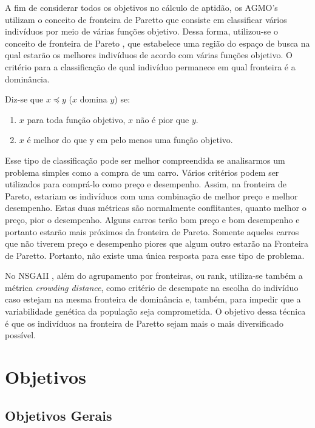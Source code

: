 \documentclass[]{article}
\begin{document}
	A fim de considerar todos os objetivos no cálculo de aptidão, os AGMO's utilizam o conceito de fronteira de Paretto \cite{Pareto} que consiste em classificar vários indivíduos por meio de várias funções objetivo. Dessa forma, utilizou-se o conceito de fronteira de Pareto  \cite{Pareto}, que estabelece uma região do espaço de busca na qual estarão os melhores indivíduos de acordo com várias funções objetivo. O critério para a classificação de qual indivíduo permanece em qual fronteira é a dominância.
	
	Diz-se que $x \preceq y$ ($x$ domina $y$) se:
	
	\begin{enumerate}
		\item $x$ para toda função objetivo, $x$ não é pior que $y$.
		
		\item $x$ é melhor do que y em pelo menos uma função objetivo.
	\end{enumerate}
	
	Esse tipo de classificação pode ser melhor compreendida se analisarmos um problema simples como a compra de um carro. Vários critérios podem ser utilizados para comprá-lo como preço e desempenho. Assim, na fronteira de Pareto, estariam os indivíduos com uma combinação de melhor preço e melhor desempenho. Estas duas métricas são normalmente conflitantes, quanto melhor o preço, pior o desempenho. Alguns carros terão bom preço e bom desempenho e portanto estarão mais próximos da fronteira de Pareto. Somente aqueles carros que não tiverem preço e desempenho piores que algum outro estarão na Fronteira de Paretto. Portanto, não existe uma única resposta para esse tipo de problema.
	
	No  NSGAII \cite{NSGAII}, além do agrupamento por fronteiras, ou rank, utiliza-se também a métrica \textit{crowding distance}, como critério de desempate na escolha do indivíduo caso estejam na mesma fronteira de dominância e, também, para impedir que a variabilidade genética da população seja comprometida. O objetivo dessa técnica é que os indivíduos na fronteira de Paretto sejam mais o mais diversificado possível.
	 

 	
	
\section{Objetivos}
\subsection{Objetivos Gerais}
\end{document}
